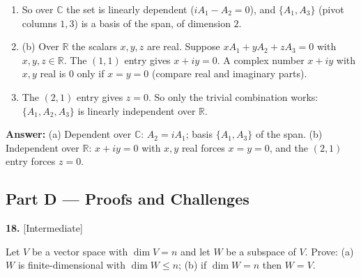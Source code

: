 \documentclass[11pt]{article}
\begin{document}
\begin{tcolorbox}[breakable,colback=ans,colframe=ansb,boxrule=0.5pt,left=4pt,right=4pt,top=2pt,bottom=2pt]
\begin{enumerate}[leftmargin=3.1em,itemsep=1pt,topsep=1pt,label=\textbf{Step \arabic*.}]
\item So over $\mathbb{C}$ the set is linearly dependent ($iA_1-A_2=0$), and $\{A_1,A_3\}$ (pivot columns $1,3$) is a basis of the span, of dimension $2$.
\item (b) Over $\mathbb{R}$ the scalars $x,y,z$ are real. Suppose $xA_1+yA_2+zA_3=0$ with $x,y,z\in\mathbb{R}$. The $(1,1)$ entry gives $x+iy=0$. A complex number $x+iy$ with $x,y$ real is $0$ only if $x=y=0$ (compare real and imaginary parts).
\item The $(2,1)$ entry gives $z=0$. So only the trivial combination works: $\{A_1,A_2,A_3\}$ is linearly independent over $\mathbb{R}$.
\end{enumerate}\textbf{Answer:} (a) Dependent over $\mathbb{C}$: $A_2=iA_1$; basis $\{A_1,A_3\}$ of the span. (b) Independent over $\mathbb{R}$: $x+iy=0$ with $x,y$ real forces $x=y=0$, and the $(2,1)$ entry forces $z=0$.\end{tcolorbox}
\par\vspace{2pt}
\subsection*{\normalsize\color{ink} Part D --- Proofs and Challenges}
\begin{minipage}{\linewidth}\textbf{18.} \hfill{\scriptsize\color{ink}[Intermediate]}\par\nopagebreak Let $V$ be a vector space with $\dim V=n$ and let $W$ be a subspace of $V$. Prove: (a) $W$ is finite-dimensional with $\dim W\le n$; (b) if $\dim W=n$ then $W=V$.
\end{minipage}\par\nopagebreak
\end{document}
